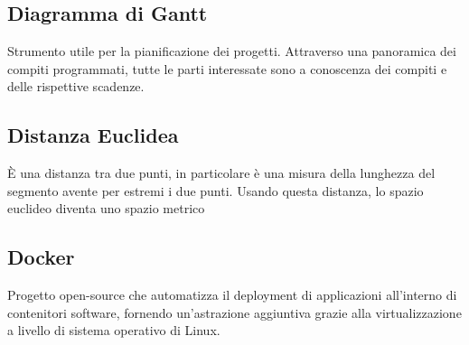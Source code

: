 \documentclass[../glossario.tex]{subfiles}
\begin{document}
\subsection*{Diagramma di Gantt}
Strumento utile per la pianificazione dei progetti. Attraverso una panoramica dei compiti programmati, tutte le parti interessate sono a conoscenza dei compiti e delle rispettive scadenze.

\subsection*{Distanza Euclidea}
È una distanza tra due punti, in particolare è una misura della lunghezza del segmento avente per estremi i due punti. Usando questa distanza, lo spazio euclideo diventa uno spazio metrico

\subsection*{Docker}
Progetto open-source che automatizza il deployment di applicazioni all'interno di contenitori software, fornendo un'astrazione aggiuntiva grazie alla virtualizzazione a livello di sistema operativo di Linux.
\end{document}

